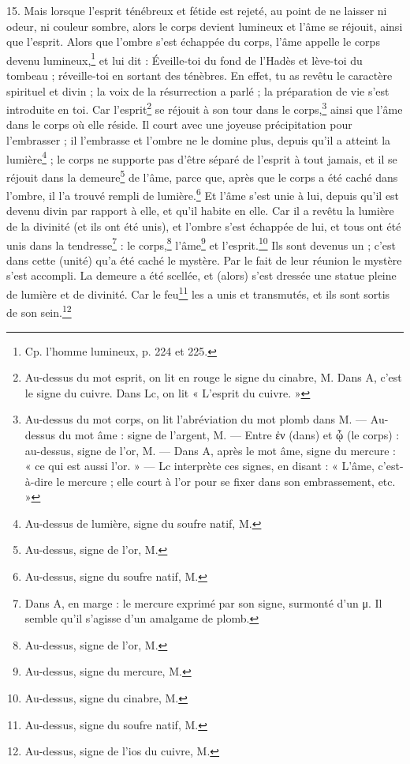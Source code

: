 \documentclass[a4paper, 11pt, oneside, polutonikogreek, french]{article}
\begin{document}
15. Mais lorsque l'esprit ténébreux et fétide est rejeté, au point de ne laisser ni odeur, ni couleur sombre, alors le corps devient lumineux et l'âme se réjouit, ainsi que l'esprit. Alors que l'ombre s'est échappée du corps, l'âme appelle le corps devenu lumineux,\footnote{Cp. l'homme lumineux, p. 224 et 225.} et lui dit : Éveille-toi du fond de l'Hadès et lève-toi du tombeau ; réveille-toi en sortant des ténèbres. En effet, tu as revêtu le caractère spirituel et divin ; la voix de la résurrection a parlé ; la préparation de vie s'est introduite en toi. Car l'esprit\footnote{Au-dessus du mot esprit, on lit en rouge le signe du cinabre, M. Dans A, c'est le signe du cuivre. Dans Lc, on lit « L'esprit du cuivre. »} se réjouit à son tour dans le corps,\footnote{Au-dessus du mot corps, on lit l'abréviation du mot plomb dans M. --- Au-dessus du mot âme : signe de l'argent, M. --- Entre ἐν (dans) et ᾧ (le corps) : au-dessus, signe de l'or, M. --- Dans A, après le mot âme, signe du mercure : « ce qui est aussi l'or. » --- Lc interprète ces signes, en disant : « L'âme, c'est-à-dire le mercure ; elle court à l'or pour se fixer dans son embrassement, etc. »} ainsi que l'âme dans le corps où elle réside. Il court avec une joyeuse précipitation pour l'embrasser ; il l'embrasse et l'ombre ne le domine plus, depuis qu'il a atteint la lumière\footnote{Au-dessus de lumière, signe du soufre natif, M.} ; le corps ne supporte pas d'être séparé de l'esprit à tout jamais, et il se réjouit dans la demeure\footnote{Au-dessus, signe de l'or, M.} de l'âme, parce que, après que le corps a été caché dans l'ombre, il l'a trouvé rempli de lumière.\footnote{Au-dessus, signe du soufre natif, M.} Et l'âme s'est unie à lui, depuis qu'il est devenu divin par rapport à elle, et qu'il habite en elle. Car il a revêtu la lumière de la divinité (et ils ont été unis), et l'ombre s'est échappée de lui, et tous ont été unis dans la tendresse\footnote{Dans A, en marge : le mercure exprimé par son signe, surmonté d'un μ. Il semble qu'il s'agisse d'un amalgame de plomb.} : le corps,\footnote{Au-dessus, signe de l'or, M.} l'âme\footnote{Au-dessus, signe du mercure, M.} et l'esprit.\footnote{Au-dessus, signe du cinabre, M.} Ils sont devenus un ; c'est dans cette (unité) qu'a été caché le mystère. Par le fait de leur réunion le mystère s'est accompli. La demeure a été scellée, et (alors) s'est dressée une statue pleine de lumière et de divinité. Car le feu\footnote{Au-dessus, signe du soufre natif, M.} les a unis et transmutés, et ils sont sortis de son sein.\footnote{Au-dessus, signe de l'ios du cuivre, M.}
\end{document}
